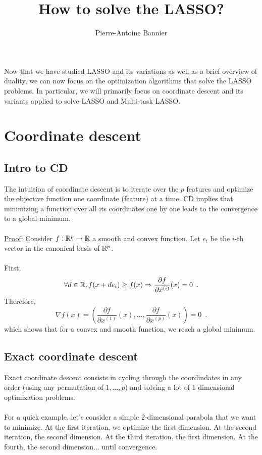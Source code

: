 \documentclass[a4paper,10pt]{article}
\author{Pierre-Antoine Bannier}
\title{How to solve the LASSO?}
\theoremstyle{definition}
\begin{document}
\maketitle

\vskip 0.3in

Now that we have studied LASSO and its variations as well as a brief overview of
duality, we can now focus on the optimization algorithms that solve the LASSO problems.
In particular, we will primarily focus on coordinate descent and its variants applied
to solve LASSO and Multi-task LASSO.



\section*{Coordinate descent}
\label{section_1}

\subsection*{Intro to CD}

The intuition of coordinate descent is to iterate over the $p$ features and optimize the
objective function one coordinate (feature) at a time. CD implies that minimizing a function
over all its coordinates one by one leads to the convergence to a global minimum.
\\
\\
\underline{Proof}: Consider $f : \mathbb{R}^p \rightarrow \mathbb{R}$ a smooth and convex function.
Let $e_i$ be the $i$-th vector in the canonical basis of $\mathbb{R}^p$.
\\
\\
First,
\begin{equation*}
    \forall d \in \mathbb{R}, f(x + de_i) \geq f(x)
    \Rightarrow
    \frac{\partial f}{\partial x^{(i)}}(x) = 0
    \enspace .
\end{equation*}
%
Therefore,
\begin{equation*}
    \nabla f(x) = \left(
    \frac{\partial f}{\partial x^{(1)}}(x),
    \dots,
    \frac{\partial f}{\partial x^{(p)}}(x)
    \right) = 0
    \enspace .
\end{equation*}
%
which shows that for a convex and smooth function, we reach a global minimum.

\subsection*{Exact coordinate descent}

Exact coordinate descent consists in cycling through the coordindates in any order
(using any permutation of $1, \dots, p$) and solving a lot of 1-dimensional optimization
problems.
\\
\\
For a quick example, let's consider a simple 2-dimensional parabola that we want to minimize.
At the first iteration, we optimize the first dimension. At the second iteration, the second dimension.
At the third iteration, the first dimension. At the fourth, the second dimension... until convergence.
\end{document}
